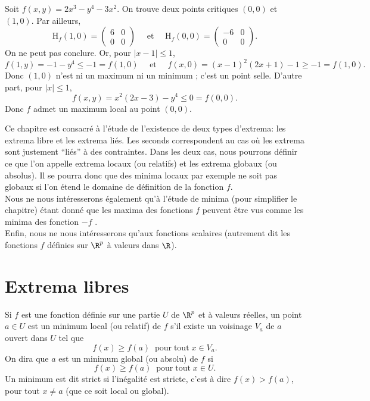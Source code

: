 \documentclass[12pt, class=report,crop=false]{standalone}
\begin{document}
{\vskip6mm

Soit $f(x,y)=2x^3-y^4-3x^2$. On trouve deux points critiques $(0,0)$ et $(1,0)$. Par ailleurs,
$$\mbox{H}_f(1,0)=\left(\begin{array}{cc}6&0\\ 0&0\end{array}\right)\quad \mbox{ et }\quad \mbox{H}_f(0,0)=\left(\begin{array}{cc}-6&0\\ 0&0\end{array}\right).$$
On ne peut pas conclure. Or, pour $|x-1|\leq 1$,
$$f(1,y)=-1-y^4\leq -1=f(1,0)\quad \mbox{ et }\quad f(x,0)=(x-1)^2(2x+1)-1\geq -1=f(1,0).$$
Donc $(1,0)$ n'est ni un maximum ni un minimum ; c'est un point selle. D'autre part, pour $|x|\leq 1$,
$$f(x,y)=x^2(2x-3)-y^4\leq 0=f(0,0).$$
Donc $f$ admet un maximum local au point $(0,0)$.





Ce chapitre est consacré à l'étude de l'existence de deux types d'extrema: les extrema libre et les extrema liés. Les seconds correspondent au cas où les extrema sont justement ``liés'' à des contraintes. Dans les deux cas, nous pourrons définir ce que l'on appelle extrema locaux (ou relatifs) et les extrema globaux (ou absolus). Il se pourra donc que des minima locaux par exemple ne soit pas globaux si l'on étend
le domaine de définition de la fonction $f$. \\
Nous ne nous intéresserons également qu'à l'étude de minima (pour simplifier le chapitre) étant donné que  les maxima des fonctions $f$ peuvent être vus comme les minima des fonction $-f$ .\\
Enfin, nous ne nous intéresserons qu'aux fonctions scalaires (autrement dit les fonctions $f$ définies sur $\R^p$ à valeurs dans $\R$).\\
$ $\\

\section{Extrema libres}


\begin{definition}
\textcolor[rgb]{0.98,0.00,0.00}{
  Si $f$ est une fonction d\'efinie sur une partie $U$ de $\R^p$ et \`a valeurs r\'eelles, un point $a \in U$
  est un minimum local (ou relatif) de $f$ s'il existe un voisinage $V_a$ de $a$ ouvert dans $U$ tel que
  \begin{equation*}
    f(x)\geq f(a) \;\mathrm{\;pour\;tout}\; x\in V_a.
  \end{equation*}
  On dira que $a$ est un minimum global (ou absolu) de $f$ si
  \begin{equation*}
    f(x) \geq f(a)\;\mathrm{\;pour\;tout}\; x\in U.
  \end{equation*}
  Un minimum est dit strict si l'in\'egalit\'e est stricte, c'est \`a dire $f(x)>f(a)$, pour tout $x\neq a$ (que ce soit local ou global).}
\end{definition}


}
\end{document}
